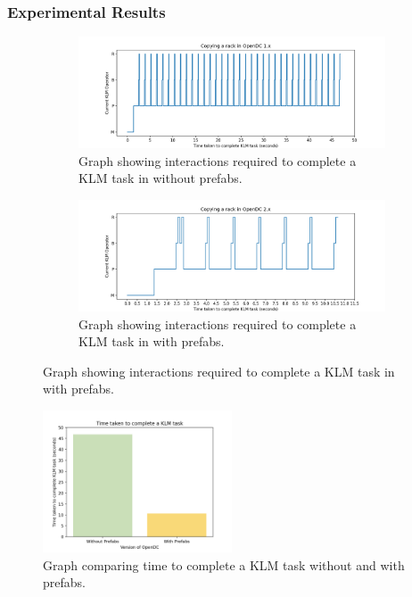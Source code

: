 \documentclass[11pt]{article}
\begin{document}
		\subsubsection{Experimental Results}
			\begin{figure}
				\centering	
				\begin{subfigure}[b]{\textwidth}
					\centering
					\includegraphics[width=\textwidth]{results/opendc1.png}
					\caption[Graph showing interactions required to complete a KLM task in \opendc{} without our extensions]{Graph showing interactions required to complete a KLM task in \opendc{} without prefabs.}
					\label{fig:opendcklm1}
				\end{subfigure}
				\vfill
				\begin{subfigure}[b]{\textwidth}
					\centering
					\includegraphics[width=\textwidth]{results/opendc2.png}
					\caption[Graph showing interactions required to complete a KLM task in \opendc{} with our extensions]{Graph showing interactions required to complete a KLM task in \opendc{} with prefabs.}
					\label{fig:opendcklm2}
				\end{subfigure}
				\label{fig:opendcklm}
			\end{figure}
			\begin{figure}[]
				\centering
				\includegraphics[width=0.5\textwidth]{results/klmbarcharts.png}
				\caption[Graph comparing time to complete a KLM task in two variants of \opendc{}]{Graph comparing time to complete a KLM task without and with prefabs.}
				\label{fig:opendcbarchart}
			\end{figure}
\end{document}
